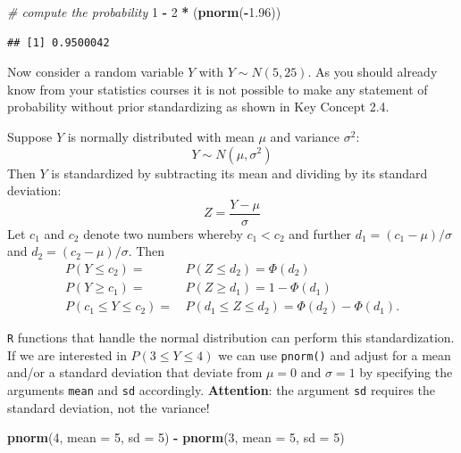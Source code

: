 \documentclass[]{book}
\newenvironment{Shaded}{\begin{snugshade}}{\end{snugshade}}
\newcommand{\KeywordTok}[1]{\textcolor[rgb]{0.13,0.29,0.53}{\textbf{#1}}}
\newcommand{\DataTypeTok}[1]{\textcolor[rgb]{0.13,0.29,0.53}{#1}}
\newcommand{\DecValTok}[1]{\textcolor[rgb]{0.00,0.00,0.81}{#1}}
\newcommand{\FloatTok}[1]{\textcolor[rgb]{0.00,0.00,0.81}{#1}}
\newcommand{\StringTok}[1]{\textcolor[rgb]{0.31,0.60,0.02}{#1}}
\newcommand{\CommentTok}[1]{\textcolor[rgb]{0.56,0.35,0.01}{\textit{#1}}}
\newcommand{\OperatorTok}[1]{\textcolor[rgb]{0.81,0.36,0.00}{\textbf{#1}}}
\newcommand{\NormalTok}[1]{#1}
\theoremstyle{definition}
\theoremstyle{definition}
\theoremstyle{definition}
\theoremstyle{remark}
\begin{document}
\begin{Shaded}
\begin{Highlighting}[]
\CommentTok{# compute the probability}
\DecValTok{1} \OperatorTok{-}\StringTok{ }\DecValTok{2} \OperatorTok{*}\StringTok{ }\NormalTok{(}\KeywordTok{pnorm}\NormalTok{(}\OperatorTok{-}\FloatTok{1.96}\NormalTok{)) }
\end{Highlighting}
\end{Shaded}

\begin{verbatim}
## [1] 0.9500042
\end{verbatim}

Now consider a random variable \(Y\) with \(Y \sim N(5, 25)\). As you
should already know from your statistics courses it is not possible to
make any statement of probability without prior standardizing as shown
in Key Concept 2.4.

\begin{keyconcepts}{2.4}

Suppose $Y$ is normally distributed with mean $\mu$ and variance $\sigma^2$: $$Y
\sim N(\mu, \sigma^2)$$ Then $Y$ is standardized by subtracting its mean and
dividing by its standard deviation: $$ Z = \frac{Y -\mu}{\sigma} $$ Let $c_1$
and $c_2$ denote two numbers whereby $c_1 < c_2$ and further $d_1 = (c_1 - \mu)
/ \sigma$ and $d_2 = (c_2 - \mu)/\sigma$. Then
\begin{align} 
P(Y \leq c_2) =& \, P(Z \leq d_2) = \Phi(d_2) \\ 
P(Y \geq c_1) =& \, P(Z \geq d_1) = 1 - \Phi(d_1) \\ 
P(c_1 \leq Y \leq c_2) =& \, P(d_1 \leq Z \leq d_2) = \Phi(d_2) - \Phi(d_1). 
\end{align}
\end{keyconcepts}

\texttt{R} functions that handle the normal distribution can perform
this standardization. If we are interested in \(P(3 \leq Y \leq 4)\) we
can use \texttt{pnorm()} and adjust for a mean and/or a standard
deviation that deviate from \(\mu=0\) and \(\sigma = 1\) by specifying
the arguments \texttt{mean} and \texttt{sd} accordingly.
\textbf{Attention}: the argument \texttt{sd} requires the standard
deviation, not the variance!

\begin{Shaded}
\begin{Highlighting}[]
\KeywordTok{pnorm}\NormalTok{(}\DecValTok{4}\NormalTok{, }\DataTypeTok{mean =} \DecValTok{5}\NormalTok{, }\DataTypeTok{sd =} \DecValTok{5}\NormalTok{) }\OperatorTok{-}\StringTok{ }\KeywordTok{pnorm}\NormalTok{(}\DecValTok{3}\NormalTok{, }\DataTypeTok{mean =} \DecValTok{5}\NormalTok{, }\DataTypeTok{sd =} \DecValTok{5}\NormalTok{) }
\end{Highlighting}
\end{Shaded}
\end{document}
